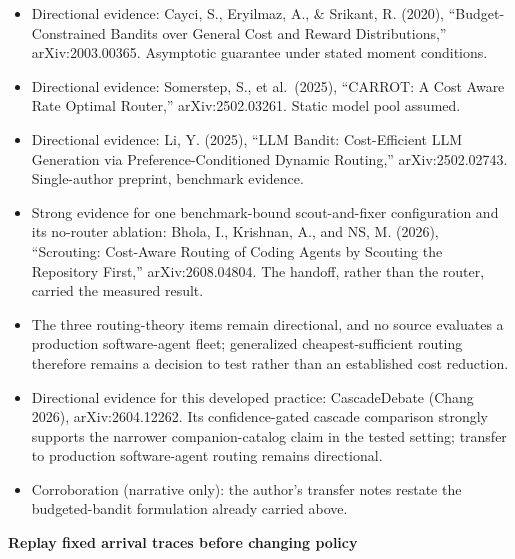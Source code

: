 \begin{itemize}
\tightlist
\item
  Directional evidence: Cayci, S., Eryilmaz, A., \& Srikant, R. (2020), ``Budget-Constrained Bandits over General Cost and Reward Distributions,'' arXiv:2003.00365. Asymptotic guarantee under stated moment conditions.
\item
  Directional evidence: Somerstep, S., et al.~(2025), ``CARROT: A Cost Aware Rate Optimal Router,'' arXiv:2502.03261. Static model pool assumed.
\item
  Directional evidence: Li, Y. (2025), ``LLM Bandit: Cost-Efficient LLM Generation via Preference-Conditioned Dynamic Routing,'' arXiv:2502.02743. Single-author preprint, benchmark evidence.
\item
  Strong evidence for one benchmark-bound scout-and-fixer configuration and its no-router ablation: Bhola, I., Krishnan, A., and NS, M. (2026), ``Scrouting: Cost-Aware Routing of Coding Agents by Scouting the Repository First,'' arXiv:2608.04804. The handoff, rather than the router, carried the measured result.
\item
  The three routing-theory items remain directional, and no source evaluates a production software-agent fleet; generalized cheapest-sufficient routing therefore remains a decision to test rather than an established cost reduction.
\item
  Directional evidence for this developed practice: CascadeDebate (Chang 2026), arXiv:2604.12262. Its confidence-gated cascade comparison strongly supports the narrower companion-catalog claim in the tested setting; transfer to production software-agent routing remains directional.
\item
  Corroboration (narrative only): the author's transfer notes restate the budgeted-bandit formulation already carried above.
\end{itemize}

\textbf{Replay fixed arrival traces before changing policy}

